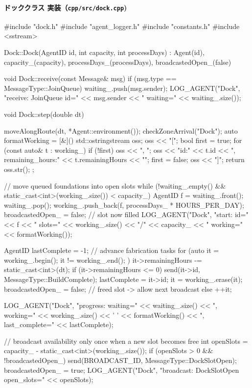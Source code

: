 \documentclass[10pt,letterpaper]{jsarticle}
\begin{document}
\paragraph{ドッククラス 実装（\texttt{cpp/src/dock.cpp})}
\begin{cppcode}
#include "dock.h"
#include "agent_logger.h"
#include "constants.h"
#include <sstream>

Dock::Dock(AgentID id, int capacity, int processDays)
    : Agent(id), capacity_(capacity), processDays_(processDays),
      broadcastedOpen_(false) {}

void Dock::receive(const Message& msg) {
    if (msg.type == MessageType::JoinQueue) {
        waiting_.push(msg.sender);
        LOG_AGENT("Dock", "receive: JoinQueue id=" << msg.sender
                  << " waiting=" << waiting_.size());
    }
}

void Dock::step(double dt) {
    moveAlongRoute(dt, *Agent::environment());
    checkZoneArrival("Dock");
    auto formatWorking = [&]() {
        std::ostringstream oss;
        oss << "[";
        bool first = true;
        for (const auto& t : working_) {
            if (!first) oss << ", ";
            oss << "{id:" << t.id << ", remaining_hours:" << t.remainingHours << "}";
            first = false;
        }
        oss << "]";
        return oss.str();
    };

    // move queued foundations into open slots
    while (!waiting_.empty() && static_cast<int>(working_.size()) < capacity_) {
        AgentID f = waiting_.front();
        waiting_.pop();
        working_.push_back({f, processDays_ * HOURS_PER_DAY});
        broadcastedOpen_ = false; // slot now filled
        LOG_AGENT("Dock", "start: id=" << f << " slots=" << working_.size()
                  << "/" << capacity_ << " working=" << formatWorking());
    }

    AgentID lastComplete = -1;
    // advance fabrication tasks
    for (auto it = working_.begin(); it != working_.end(); ) {
        it->remainingHours -= static_cast<int>(dt);
        if (it->remainingHours <= 0) {
            send(it->id, MessageType::BuildComplete);
            lastComplete = it->id;
            it = working_.erase(it);
            broadcastedOpen_ = false; // freed slot -> allow next broadcast
        } else {
            ++it;
        }
    }

    LOG_AGENT("Dock", "progress: waiting=" << waiting_.size()
              << ", working=" << working_.size() << ' ' << formatWorking()
              << ", last_complete=" << lastComplete);

    // broadcast availability only once when a new slot becomes free
    int openSlots = capacity_ - static_cast<int>(working_.size());
    if (openSlots > 0 && !broadcastedOpen_) {
        send(BROADCAST_ID, MessageType::DockSlotOpen);
        broadcastedOpen_ = true;
        LOG_AGENT("Dock", "broadcast: DockSlotOpen open_slots=" << openSlots);
    }
}

\end{cppcode}
\end{document}
